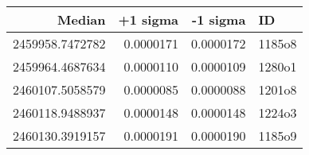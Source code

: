 \begin{tabular}{rrrl}
\toprule
Median & +1 sigma & -1 sigma & ID \\
\midrule
2459958.7472782 & 0.0000171 & 0.0000172 & 1185o8 \\
2459964.4687634 & 0.0000110 & 0.0000109 & 1280o1 \\
2460107.5058579 & 0.0000085 & 0.0000088 & 1201o8 \\
2460118.9488937 & 0.0000148 & 0.0000148 & 1224o3 \\
2460130.3919157 & 0.0000191 & 0.0000190 & 1185o9 \\
\bottomrule
\end{tabular}
